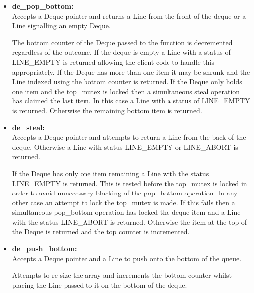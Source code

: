 \begin{itemize}
\item \textbf{de\_pop\_bottom: } \\
                         Accepts a Deque pointer and returns a Line from the front of the deque or a Line signalling an empty Deque.
                         
                         The bottom counter of the Deque passed to the function is decremented regardless of the outcome.
                         If the deque is empty a Line with a status of LINE\_EMPTY is returned 
                         allowing the client code to handle this appropriately. 
                         If the Deque has more than one item it may be shrunk and the Line indexed using the bottom counter is returned.
                         If the Deque only holds one item and the top\_mutex is locked then a simultaneous steal operation has claimed
                         the last item. In this case a Line with a status of LINE\_EMPTY is returned. 
                         Otherwise the remaining bottom item is returned.

\item \textbf{de\_steal: } \\
                         Accepts a Deque pointer and attempts to return a Line from the back of the deque. Otherwise a Line with 
                         status LINE\_EMPTY or LINE\_ABORT is returned. 
                         
                         If the Deque has only one item remaining a Line with the status LINE\_EMPTY is returned. 
                         This is tested before the top\_mutex is locked in order to avoid unnecessary blocking of the pop\_bottom operation.
                         In any other case an attempt to lock the top\_mutex is made. If this fails then a simultaneous pop\_bottom operation
                         has locked the deque item and a Line with the status LINE\_ABORT is returned. 
                         Otherwise the item at the top of the Deque is returned and the top counter is incremented.
                       
\item \textbf{de\_push\_bottom: } \\
                         Accepts a Deque pointer and a Line to push onto the bottom of the queue. 
                         
                         Attempts to re-size the array and increments the bottom counter whilst placing the 
                         Line passed to it on the bottom of the deque.
\end{itemize}

